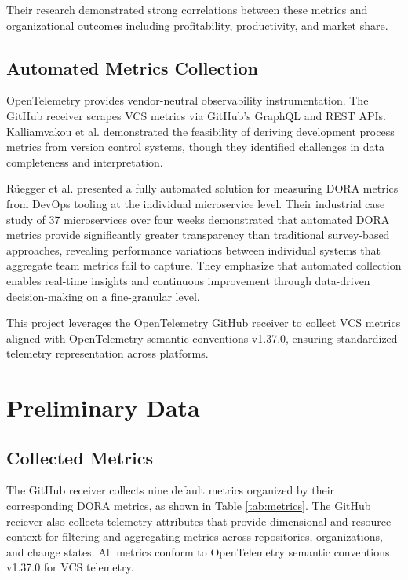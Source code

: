 \documentclass[12pt]{article}
\begin{document}
Their research demonstrated strong correlations between these metrics and
organizational outcomes including profitability, productivity, and market share.

\subsection{Automated Metrics Collection}

OpenTelemetry \cite{opentelemetry2021} provides vendor-neutral observability
instrumentation. The GitHub receiver \cite{opentelemetry-github-receiver} scrapes
VCS metrics via GitHub's GraphQL and REST APIs. Kalliamvakou et al.
\cite{kalliamvakou2014promises} demonstrated the feasibility of deriving
development process metrics from version control systems, though they identified
challenges in data completeness and interpretation.

Rüegger et al. \cite{rueegger2024fully} presented a fully automated solution for
measuring DORA metrics from DevOps tooling at the individual microservice level.
Their industrial case study of 37 microservices over four weeks demonstrated that
automated DORA metrics provide significantly greater transparency than traditional
survey-based approaches, revealing performance variations between individual systems
that aggregate team metrics fail to capture.
They emphasize that automated collection enables real-time insights and continuous
improvement through data-driven decision-making on a fine-granular level.

This project leverages the OpenTelemetry GitHub receiver to collect VCS metrics
aligned with OpenTelemetry semantic conventions v1.37.0, ensuring standardized
telemetry representation across platforms.

\section{Preliminary Data}

\subsection{Collected Metrics}

The GitHub receiver collects nine default metrics organized by their corresponding DORA metrics, as shown in Table \ref{tab:metrics}.
The GitHub reciever also collects telemetry attributes that provide dimensional and resource context for
filtering and aggregating metrics across repositories, organizations, and change states.
All metrics conform to OpenTelemetry semantic conventions v1.37.0 for VCS telemetry.
\end{document}

